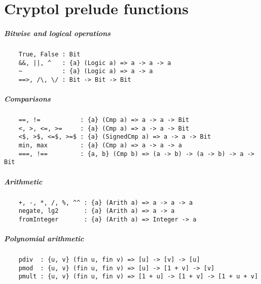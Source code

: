\chapter{Cryptol prelude functions}


\paragraph*{Bitwise and logical operations}
\begin{Verbatim}
    True, False : Bit
    &&, ||, ^   : {a} (Logic a) => a -> a -> a
    ~           : {a} (Logic a) => a -> a
    ==>, /\, \/ : Bit -> Bit -> Bit
\end{Verbatim}
\paragraph*{Comparisons}
\begin{Verbatim}
    ==, !=           : {a} (Cmp a) => a -> a -> Bit
    <, >, <=, >=     : {a} (Cmp a) => a -> a -> Bit
    <$, >$, <=$, >=$ : {a} (SignedCmp a) => a -> a -> Bit
    min, max         : {a} (Cmp a) => a -> a -> a
    ===, !==         : {a, b} (Cmp b) => (a -> b) -> (a -> b) -> a -> Bit
\end{Verbatim}
\paragraph*{Arithmetic}
\begin{Verbatim}
    +, -, *, /, %, ^^ : {a} (Arith a) => a -> a -> a
    negate, lg2       : {a} (Arith a) => a -> a
    fromInteger       : {a} (Arith a) => Integer -> a
\end{Verbatim}
\paragraph*{Polynomial arithmetic}
\begin{Verbatim}
    pdiv  : {u, v} (fin u, fin v) => [u] -> [v] -> [u]
    pmod  : {u, v} (fin u, fin v) => [u] -> [1 + v] -> [v]
    pmult : {u, v} (fin u, fin v) => [1 + u] -> [1 + v] -> [1 + u + v]
\end{Verbatim}
